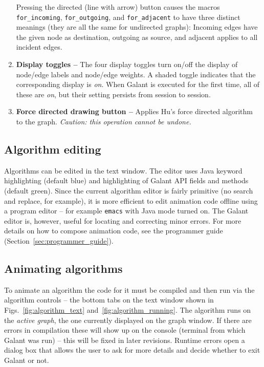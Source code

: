 \begin{enumerate}
Pressing the directed (line with arrow) button causes the macros
\texttt{for\_incoming}, \texttt{for\_outgoing}, and \texttt{for\_adjacent}
to have three distinct meanings (they are all the same for undirected graphs):
Incoming edges have the given node as destination, outgoing as source, and adjacent applies to all incident edges.

\item
\textbf{Display toggles --}
The four display toggles turn on/off the display of node/edge labels and node/edge weights.
A shaded toggle indicates that the corresponding display is \emph{on}.
When Galant is executed for the first time, all of these are \emph{on},
but their setting persists from session to session.

\item
\textbf{Force directed drawing button -- }
Applies Hu's force directed algorithm~\cite{2006-Mathematica-Hu} to the graph.
\emph{Caution: this operation cannot be undone.}

\end{enumerate}

\subsection{Algorithm editing}
\label{sec:algorithm_editing}

Algorithms can be edited in the text window. The
editor uses Java keyword highlighting (default blue) and
highlighting of Galant API fields and methods (default green).
Since the current algorithm editor is fairly primitive (no search and replace, for example),
it is more efficient to edit animation code offline using a program editor --
for example \texttt{emacs} with Java mode turned on.
The Galant editor is, however, useful for locating and correcting minor errors.
For more details on how to compose animation code, see the programmer guide
(Section~\ref{sec:programmer_guide}).

\subsection{Animating algorithms}
\label{sec:animating_algorithms}

To animate an algorithm the code for it must be compiled and then run via the
algorithm controls
 -- the bottom tabs on the text window shown in Figs.~\ref{fig:algorithm_text}
and~\ref{fig:algorithm_running}.
The algorithm runs on the \emph{active graph}, the one currently displayed
on the graph window.
If there are errors in compilation these will show up on the console (terminal
from which Galant was run) -- this will be fixed in later revisions.
Runtime errors open a dialog box that allows the user to ask for more details
and decide whether to exit Galant or not.

